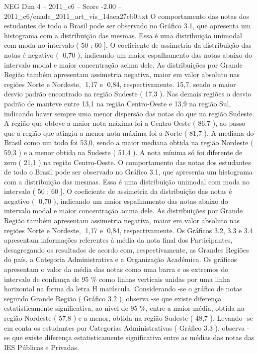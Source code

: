 \begin{textsample}{NEG Dim 4 – 2011\_c6 – Score -2.00 – 2011\_c6/enade\_2011\_art\_vis\_14aea27cb0.txt}
O comportamento das notas dos estudantes de todo o Brasil pode ser observado no Gráfico 3.1, que apresenta um histograma com a distribuição das mesmas.
Essa é uma distribuição unimodal com moda no intervalo ( 50 ; 60 ].
O coeficiente de assimetria da distribuição das notas é negativo ( 0,70 ), indicando um maior espalhamento das notas abaixo do intervalo modal e maior concentração acima dele.
As distribuições por Grande Região também apresentam assimetria negativa, maior em valor absoluto nas regiões Norte e Nordeste, 1,17 e 0,84, respectivamente. 15,7, sendo o maior desvio padrão encontrado na região Sudeste ( 17,3 ).
Nas demais regiões o desvio padrão de manteve entre 13,1 na região Centro-Oeste e 13,9 na região Sul, indicando haver sempre uma menor dispersão das notas do que na região Sudeste.
A região que obteve a maior nota máxima foi a Centro-Oeste ( 86,7 ), ao passo que a região que atingiu a menor nota máxima foi a Norte ( 81,7 ).
A mediana do Brasil como um todo foi 53,0, sendo a maior mediana obtida na região Nordeste ( 59,3 ) e a menor obtida na Sudeste ( 51,4 ).
A nota mínima só foi diferente de zero ( 21,1 ) na região Centro-Oeste.
O comportamento das notas dos estudantes de todo o Brasil pode ser observado no Gráfico 3.1, que apresenta um histograma com a distribuição das mesmas.
Essa é uma distribuição unimodal com moda no intervalo ( 50 ; 60 ].
O coeficiente de assimetria da distribuição das notas é negativo ( 0,70 ), indicando um maior espalhamento das notas abaixo do intervalo modal e maior concentração acima dele.
As distribuições por Grande Região também apresentam assimetria negativa, maior em valor absoluto nas regiões Norte e Nordeste, 1,17 e 0,84, respectivamente.
Os Gráficos 3.2, 3.3 e 3.4 apresentam informações referentes à média da nota final dos Participantes, desagregando os resultados de acordo com, respectivamente, as Grandes Regiões do país, a Categoria Administrativa e a Organização Acadêmica.
Os gráficos apresentam o valor da média das notas como uma barra e os extremos do intervalo de confiança de 95 \% como linhas verticais unidas por uma linha horizontal na forma da letra H maiúscula.
Considerando -se o gráfico de notas segundo Grande Região ( Gráfico 3.2 ), observa -se que existe diferença estatisticamente significativa, ao nível de 95 \%, entre a maior média, obtida na região Nordeste ( 57,8 ) e a menor, obtida na região Sudeste ( 48,7 ).
Levando -se em conta os estudantes por Categorias Administrativas ( Gráfico 3.3 ), observa -se que existe diferença estatisticamente significativa entre as médias das notas das IES Públicas e Privadas.

\end{textsample}
